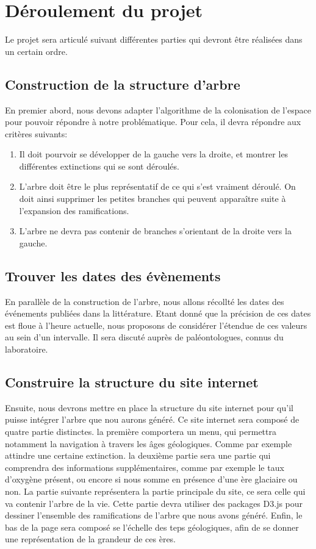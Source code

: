 \documentclass[a4paper]{article}
\begin{document}
{\section{Déroulement du projet}
	Le projet sera articulé suivant différentes parties qui devront être réalisées dans un certain ordre.
			
	\subsection{Construction de la structure d'arbre}
		En premier abord, nous devons adapter l'algorithme de la colonisation de l'espace pour pouvoir répondre à notre problématique. Pour cela, il devra répondre aux critères suivants:
		\begin{enumerate}
			\item Il doit pourvoir se développer de la gauche vers la droite, et montrer les différentes extinctions qui se sont déroulés.
			\item L'arbre doit être le plus représentatif de ce qui s'est vraiment déroulé. On doit ainsi supprimer les petites branches qui peuvent apparaître suite à l'expansion des ramifications.
			\item L'arbre ne devra pas contenir de branches s'orientant de la droite vers la gauche.
		\end{enumerate}
	 
	\subsection{Trouver les dates des évènements}
		En parallèle de la construction de l'arbre, nous allons récollté les dates des événements publiées dans la littérature. Etant donné que la précision de ces dates est floue à l'heure actuelle, nous proposons de considérer l'étendue de ces valeurs au sein d'un intervalle. Il sera discuté auprès de paléontologues, connus du laboratoire.

	\subsection{Construire la structure du site internet}
		Ensuite, nous devrons mettre en place la structure du site internet pour qu'il puisse intégrer l'arbre que nou aurons généré. Ce site internet sera composé de quatre partie distinctes. la première comportera un menu, qui permettra notamment la navigation à travers les âges géologiques. Comme par exemple attindre une certaine extinction. la deuxième partie sera une partie qui comprendra des informations supplémentaires, comme par exemple le taux d'oxygène présent, ou encore si nous somme en présence d'une ère glaciaire ou non.
		La partie suivante représentera la partie principale du site, ce sera celle qui va contenir l'arbre de la vie. Cette partie devra utiliser des packages D3.js pour dessiner l'ensemble des ramifications de l'arbre que nous avons généré.
		Enfin, le bas de la page sera composé se l'échelle des teps géologiques, afin de se donner une représentation de la grandeur de ces ères.

}
\end{document}
